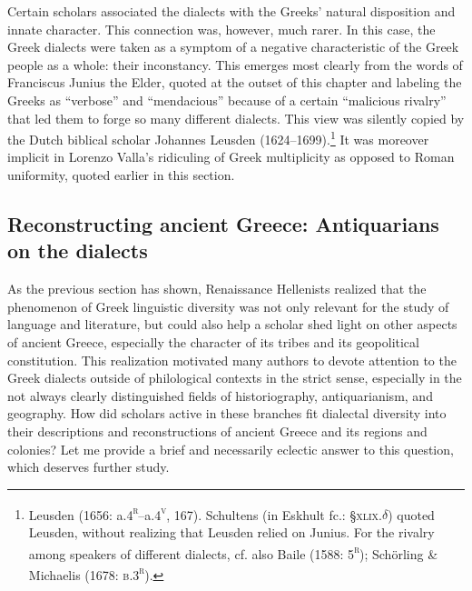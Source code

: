 \begin{styleStandard}
Certain scholars associated the dialects with the Greeks’ natural disposition and innate character. This connection was, however, much rarer. In this case, the Greek dialects were taken as a symptom of a negative characteristic of the Greek people as a whole: their inconstancy. This emerges most clearly from the words of Franciscus Junius the Elder, quoted at the outset of this chapter and labeling the Greeks as “verbose” and “mendacious” because of a certain “malicious rivalry” that led them to forge so many different dialects. This view was silently copied by the Dutch biblical scholar Johannes Leusden (1624–1699).\footnote{ Leusden (1656: a.4\textsc{\textsuperscript{r}}\textsc{–}a.4\textsc{\textsuperscript{v}}, 167). Schultens (in Eskhult fc.: §\textsc{xlix.}$\delta $) quoted Leusden, without realizing that Leusden relied on Junius. For the rivalry among speakers of different dialects, cf. also Baile (1588: 5\textsc{\textsuperscript{r}}); Schörling \& Michaelis (1678: \textsc{b.3}\textsc{\textsuperscript{r}}\textsc{)}.} It was moreover implicit in Lorenzo Valla’s ridiculing of Greek multiplicity as opposed to Roman uniformity, quoted earlier in this section.
\end{styleStandard}

\subsection{Reconstructing ancient Greece: Antiquarians on the dialects}
\hypertarget{Toc19704855}{}\begin{styleStandard}
As the previous section has shown, Renaissance Hellenists realized that the phenomenon of Greek linguistic diversity was not only relevant for the study of language and literature, but could also help a scholar shed light on other aspects of ancient Greece, especially the character of its tribes and its geopolitical constitution. This realization motivated many authors to devote attention to the Greek dialects outside of philological contexts in the strict sense, especially in the not always clearly distinguished fields of historiography, antiquarianism, and geography. How did scholars active in these branches fit dialectal diversity into their descriptions and reconstructions of ancient Greece and its regions and colonies? Let me provide a brief and necessarily eclectic answer to this question, which deserves further study.
\end{styleStandard}


